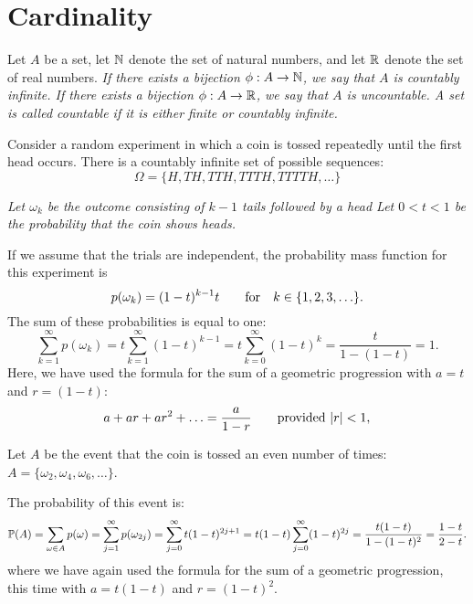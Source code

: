 \section{Cardinality}
\begin{definition}
Let $A$ be a set, let $\mathbb{N}$ denote the set of natural numbers, and let $\mathbb{R}$ denote the set of real numbers.
\ben
\it If there exists a bijection $\phi:A\to\mathbb{N}$, we say that $A$ is \emph{countably infinite}.
\it If there exists a bijection $\phi:A\to\mathbb{R}$, we say that $A$ is \emph{uncountable}.
\een
A set is called \emph{countable} if it is either finite or countably infinite.
\end{definition}

\begin{example}
Consider a random experiment in which a coin is tossed repeatedly until the first head occurs. There is a countably infinite set of possible sequences:
\[
\Omega = \{H,TH,TTH,TTTH,TTTTH,\ldots\}
\]

\bit
\it Let $\omega_k$ be the outcome consisting of $k-1$ tails followed by a head
\it Let $0<t<1$ be the probability that the coin shows heads. 
\eit

If we assume that the trials are independent, the probability mass function for this experiment is
\[
p(\omega_k) = (1-t)^{k-1}t\text{\qquad for\quad} k\in\{1,2,3,\ldots\}.
\]
The sum of these probabilities is equal to one:
\[
\sum_{k=1}^{\infty} p(\omega_k) = t\sum_{k=1}^{\infty} (1-t)^{k-1}  = t\sum_{k=0}^{\infty} (1-t)^k  = \frac{t}{1-(1-t)} = 1.
\]
Here, we have used the formula for the sum of a geometric progression with $a = t$ and $r = (1-t)$:
\[
a + ar + ar^2 + \ldots = \frac{a}{1-r} \text{\qquad provided $|r|<1$},
\]

Let $A$ be the event that the coin is tossed an even number of times: $A = \{\omega_2,\omega_4,\omega_6,\ldots \}$.

The probability of this event is:
\[
\mathbb{P}(A) 
	= \sum_{\omega\in A} p(\omega) 
	= \sum_{j=1}^{\infty} p(\omega_{2j}) 
	= \sum_{j=0}^{\infty} t(1-t)^{2j+1}
	= t(1-t)\sum_{j=0}^{\infty} (1-t)^{2j}
	= \frac{t(1-t)}{1-(1-t)^2}
	= \frac{1-t}{2-t}.
\]
where we have again used the formula for the sum of a geometric progression, this time with $a = t(1-t)$ and $r = (1-t)^2$.
\end{example}


